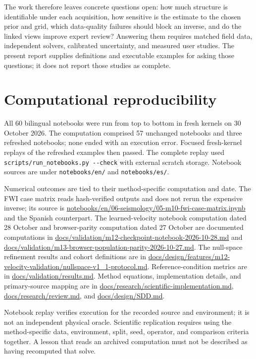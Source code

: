 The work therefore leaves concrete questions open: how much structure
is identifiable under each acquisition, how sensitive is the estimate
to the chosen prior and grid, which data-quality failures should block
an inverse, and do the linked views improve expert review? Answering
them requires matched field data, independent solvers, calibrated
uncertainty, and measured user studies. The present report supplies
definitions and executable examples for asking those questions; it does
not report those studies as complete.

\section{Computational
reproducibility}\label{computational-reproducibility}

All 60 bilingual notebooks were run from top to bottom in fresh kernels
on 30 October 2026. The computation comprised 57 unchanged notebooks and
three refreshed notebooks; none ended with an execution error. Focused
fresh-kernel replays of the refreshed examples then passed. The complete
replay used \texttt{scripts/run\_notebooks.py\ -\/-check} with external
scratch storage. Notebook sources are under \texttt{notebooks/en/} and
\texttt{notebooks/es/}.

Numerical outcomes are tied to their method-specific computation and
date. The FWI case matrix reads hash-verified outputs and does not rerun
the expensive inverse; its source is
\url{notebooks/en/06-seismology/05-m10-fwi-case-matrix.ipynb} and the
Spanish counterpart. The learned-velocity notebook computation dated 28 October and
browser-parity computation dated 27 October are documented computations
in \url{docs/validation/m12-checkpoint-notebook-2026-10-28.md} and
\url{docs/validation/m13-browser-population-parity-2026-10-27.md}. The
null-space refinement results and cohort definitions are in
\url{docs/design/features/m12-velocity-validation/nullspace-v1_1-protocol.md}.
Reference-condition metrics are in \url{docs/validation/results.md}.
Method equations, implementation details, and primary-source mapping are
in \url{docs/research/scientific-implementation.md},
\url{docs/research/review.md}, and \url{docs/design/SDD.md}.

Notebook replay verifies execution for the recorded source and
environment; it is not an independent physical oracle. Scientific
replication requires using the method-specific data, environment, split,
seed, operator, and comparison criteria together. A lesson that reads an
archived computation must not be described as having recomputed that
solve.

